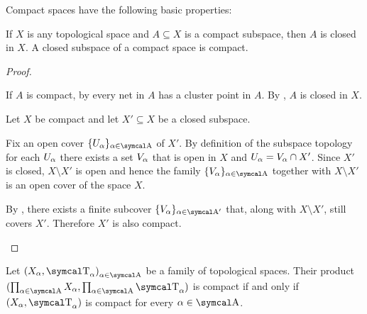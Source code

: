 \begin{proposition}\label{thm:compact_space_properties}
  Compact spaces have the following basic properties:
  \begin{propenum}
     If \( X \) is any topological space and \( A \subseteq X \) is a compact subspace, then \( A \) is closed in \( X \).
     A closed subspace of a compact space is compact.
  \end{propenum}
\end{proposition}
\begin{proof}
  \begin{description}
     If \( A \) is compact, by  every net in \( A \) has a cluster point in \( A \). By , \( A \) is closed in \( X \).

     Let \( X \) be compact and let \( X' \subseteq X \) be a closed subspace.

    Fix an open cover \( \{ U_\al \}_{\al \in \CA} \) of \( X' \). By definition of the subspace topology for each \( U_\alpha \) there exists a set \( V_\alpha \) that is open in \( X \) and \( U_\alpha = V_\alpha \cap X' \). Since \( X' \) is closed, \( X \setminus X' \) is open and hence the family \( \{ V_\al \}_{\al \in \CA} \) together with \( X \setminus X' \) is an open cover of the space \( X \).

    By , there exists a finite subcover \( \{ V_\al \}_{\al \in \CA'} \) that, along with \( X \setminus X' \), still covers \( X' \). Therefore \( X' \) is also compact.
  \end{description}
\end{proof}

\begin{theorem}\label{thm:tychonoffs_product_theorem}\cite[theorem 3.2.4]{Engelking1989}
  Let \( { (X_\al, \CT_\al) }_{\al \in \CA} \) be a family of topological spaces. Their product \( (\prod_{\al \in \CA} X_\al, \prod_{\al \in \CA} \CT_\al) \) is compact if and only if \( (X_\al, \CT_\al) \) is compact for every \( \al \in \CA \).
\end{theorem}

